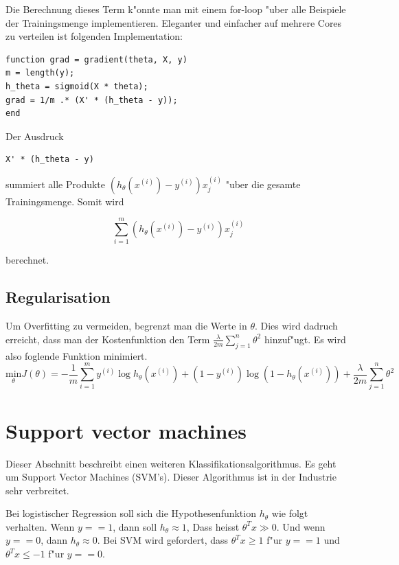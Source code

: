 \documentclass[12pt,a4paper,twoside]{article}
\begin{document}
Die Berechnung dieses Term k"onnte man mit einem for-loop "uber alle Beispiele der Trainingsmenge implementieren. Eleganter und einfacher auf mehrere Cores zu verteilen ist folgenden Implementation:

\begin{lstlisting}
function grad = gradient(theta, X, y)
m = length(y);
h_theta = sigmoid(X * theta);
grad = 1/m .* (X' * (h_theta - y));
end
\end{lstlisting}

Der Ausdruck 
\begin{lstlisting}
X' * (h_theta - y)
\end{lstlisting}
summiert alle Produkte $(h_{\theta} (x^{(i)}) - y^{(i)})x_j^{(i)}  $ "uber die gesamte Trainingsmenge. Somit wird

\begin{equation}
   \sum_{i=1}^m (h_{\theta} (x^{(i)}) - y^{(i)})x_j^{(i)}
\end{equation}

berechnet.

\subsection{Regularisation}
\label{sec:regularization}

Um Overfitting zu vermeiden, begrenzt man die Werte in $\theta$. Dies wird dadruch erreicht, dass man der Kostenfunktion den Term $\frac{\lambda}{2m} \sum_{j=1}^n \theta^2$ hinzuf"ugt. Es wird also foglende Funktion minimiert.
\begin{equation}
  \label{eq:regularization}
  \underset{\theta}{\text{min}}  J(\theta) = -\frac{1}{m} \sum_{i=1}^m y^{(i)} \log h_{\theta}(x^{(i)}) + (1 - y^{(i)}) \log(1 - h_{\theta}(x^{(i)}))+\frac{\lambda}{2m} \sum_{j=1}^n \theta^2
\end{equation}

\section{Support vector machines}
\label{sec:svm}

Dieser Abschnitt beschreibt einen weiteren Klassifikationsalgorithmus. Es geht um Support Vector Machines (SVM's). Dieser Algorithmus ist in der Industrie sehr verbreitet.

Bei logistischer Regression soll sich die Hypothesenfunktion $h_{\theta}$ wie folgt verhalten.
Wenn $y == 1$, dann soll $h_{\theta} \approx 1$, Dass heisst $\theta^T x \gg 0$. Und wenn $y == 0$, dann $h_{\theta} \approx 0$. Bei SVM wird gefordert, dass $\theta^T x \geq 1$ f"ur $y == 1$ und $\theta^T x \leq -1$ f"ur $y == 0$.
\end{document}
